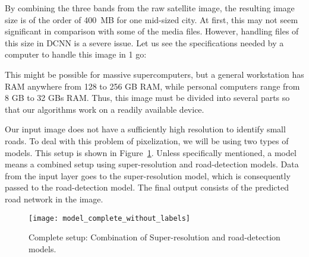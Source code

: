 By combining the three bands from the raw satellite image, the resulting image size is of the order of 400~MB for one mid-sized city. At first, this may not seem significant in comparison with some of the media files. However, handling files of this size in DCNN is a severe issue. Let us see the specifications needed by a computer to handle this image in 1 go:

\par
This might be possible for massive supercomputers, but a general workstation has RAM anywhere from 128 to 256 GB RAM, while personal computers range from 8 GB to 32 GBs RAM. Thus, this image must be divided into several parts so that our algorithms work on a readily available device. \par

Our input image does not have a sufficiently high resolution to identify small roads. To deal with this problem of pixelization, we will be using two types of models. This setup is shown in Figure~\ref{fig:model_complete_without_labels}. Unless specifically mentioned, a model means a combined setup using super-resolution and road-detection models. Data from the input layer goes to the super-resolution model, which is consequently passed to the road-detection model. The final output consists of the predicted road network in the image. \par

\begin{figure}
  \centering
  \texttt{[image: model\_complete\_without\_labels]}
  \caption{Complete setup: Combination of Super-resolution and road-detection models.}
  \label{fig:model_complete_without_labels}
\end{figure}
